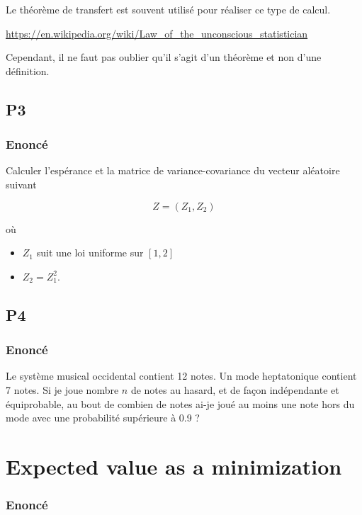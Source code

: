 \documentclass[
10pt, %
a4paper, %
oneside, %
headinclude,footinclude, %
BCOR5mm, %
]{scrartcl}
\begin{document}
Le théorème de transfert est souvent utilisé pour réaliser ce type de calcul.

\url{https://en.wikipedia.org/wiki/Law_of_the_unconscious_statistician} 

Cependant, il ne faut pas oublier qu'il s'agit d'un théorème et non d'une définition.

\subsection{\color{MidnightBlue}P3}

\subsubsection{Enoncé}
\label{par:enoncé}

Calculer l'espérance et la matrice de variance-covariance du vecteur aléatoire suivant

\begin{equation}
    Z = (Z_1, Z_2)
\end{equation}

où
\begin{itemize}
    \item $Z_1$ suit une loi uniforme sur $[1, 2]$
    \item $Z_2=Z_1^2$.
\end{itemize}


\subsection{\color{MidnightBlue}P4}

\subsubsection{Enoncé}
\label{par:enoncé}

Le système musical occidental contient 12 notes. Un mode heptatonique contient 7 notes. Si je joue nombre $n$ de notes au hasard, et de façon indépendante et équiprobable, au bout de combien de notes ai-je joué au moins une note hors du mode avec une probabilité supérieure à 0.9 ?

\section{\large\color{Blue}Expected value as a minimization}

\subsubsection{Enoncé}%
\label{ssub:Enoncé}
\end{document}
